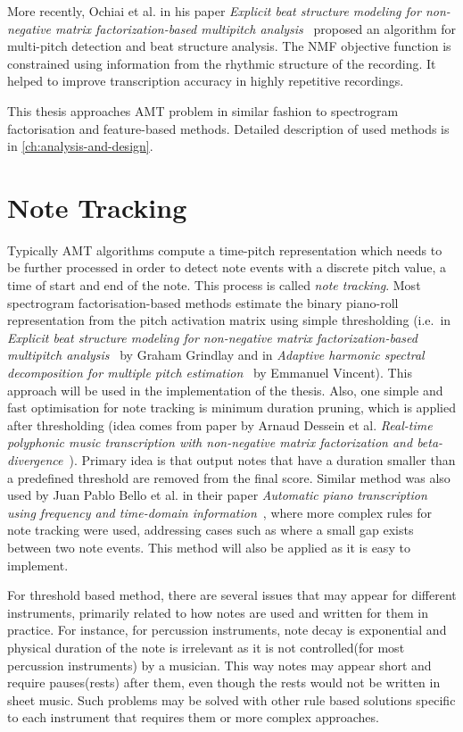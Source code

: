 More recently, Ochiai et al. in his paper \textit{Explicit beat structure modeling for non-negative matrix
factorization-based multipitch analysis}~\cite{ochiai2012explicit} proposed an algorithm for multi-pitch detection and
beat structure analysis. The \ac{NMF} objective function is constrained using information from the rhythmic structure of
the recording. It helped to improve transcription accuracy in highly repetitive recordings.

This thesis approaches \ac{AMT} problem in similar fashion to spectrogram factorisation and feature-based methods.
Detailed description of used methods is in \cref{ch:analysis-and-design}.

\section{Note Tracking}\label{sec:note-tracking}

Typically \ac{AMT} algorithms compute a time-pitch representation which needs to be further processed in order to detect
note events with a discrete pitch value, a time of start and end of the note. This process is called \textit{note
tracking}. Most spectrogram factorisation-based methods estimate the binary piano-roll representation from the pitch
activation matrix using simple thresholding (i.e.\ in \textit{Explicit beat structure modeling for non-negative matrix
factorization-based multipitch analysis}~\cite{grindlay2011transcribing} by Graham Grindlay and in \textit{Adaptive
harmonic spectral decomposition for multiple pitch estimation}~\cite{vincent2009adaptive} by Emmanuel Vincent). This
approach will be used in the implementation of the thesis. Also, one simple and fast optimisation for note tracking is
minimum duration pruning, which is applied after thresholding (idea comes from paper by Arnaud Dessein et al.
\textit{Real-time polyphonic music transcription with non-negative matrix factorization and beta-divergence}~\cite{dessein2010real}).
Primary idea is that output notes that have a duration smaller than a predefined threshold are removed from the final
score. Similar method was also used by Juan Pablo Bello et al. in their paper \textit{Automatic piano transcription
using frequency and time-domain information}~\cite{bello2006automatic}, where more complex rules for note tracking were
used, addressing cases such as where a small gap exists between two note events. This method will also be applied as it
is easy to implement.

For threshold based method, there are several issues that may appear for different instruments, primarily related to how
notes are used and written for them in practice. For instance, for percussion instruments, note decay is exponential and
physical duration of the note is irrelevant as it is not controlled(for most percussion instruments) by a musician. This
way notes may appear short and require pauses(rests) after them, even though the rests would not be written in sheet
music. Such problems may be solved with other rule based solutions specific to each instrument that requires them or
more complex approaches.

